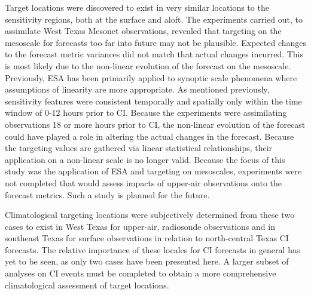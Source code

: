\documentclass{ttuthes2007}
\newcommand{\tab}{\hspace*{2em}}  %
\begin{document}
\tab Target locations were discovered to exist in very similar locations to the sensitivity regions, both at the surface and aloft. The experiments carried out, to assimilate West Texas Mesonet observations, revealed that targeting on the mesoscale for forecasts too far into future may not be plausible. Expected changes to the forecast metric variances did not match that actual changes incurred. This is most likely due to the non-linear evolution of the forecast on the mesoscale. Previously, ESA has been primarily applied to synoptic scale phenomena where assumptions of linearity are more appropriate. As mentioned previously, sensitivity features were consistent temporally and spatially only within the time window of 0-12 hours prior to CI. Because the experiments were assimilating observations 18 or more hours prior to CI, the non-linear evolution of the forecast could have played a role in altering the actual changes in the forecast. Because the targeting values are gathered via linear statistical relationships, their application on a non-linear scale is no longer valid. Because the focus of this study was the application of ESA and targeting on mesoscales, experiments were not completed that would assess impacts of upper-air observations onto the forecast metrics. Such a study is planned for the future. 

\tab Climatological targeting locations were subjectively determined from these two cases to exist in West Texas for upper-air, radiosonde observations and in southeast Texas for surface observations in relation to north-central Texas CI forecasts. The relative importance of these locales for CI forecasts in general has yet to be seen, as only two cases have been presented here. A larger subset of analyses on CI events must be completed to obtain a more comprehensive climatological assessment of target locations. 


\backmatter



\singlespacing


\end{document}
